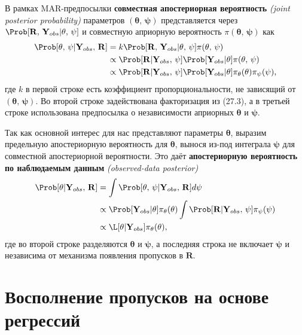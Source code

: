 В рамках MAR-предпосылки {\bf совместная апостериорная вероятность} \emph{(joint posterior probability)} параметров $(\mathbf{\theta}, \, \mathbf{\psi})$ представляется через $\Prob[\mathbf{R}, \, \mathbf{Y}_{obs}|\mathbf{\theta}, \, \mathbf{\psi}]$ и совместную априорную вероятность $\pi (\mathbf{\theta}, \, \mathbf{\psi})$ как
\begin{align}
\Prob[\mathbf{\theta}, \, \mathbf{\psi}|\mathbf{Y}_{obs}, \, \mathbf{R}] &= k \Prob[\mathbf{R}, \, \mathbf{Y}_{obs}|\mathbf{\theta}, \, \mathbf{\psi}] \pi (\mathbf{\theta}, \, \mathbf{\psi}) \\
&\propto \Prob[\mathbf{R}|\mathbf{Y}_{obs}, \, \mathbf{\psi}] \Prob[\mathbf{Y}_{obs}|\mathbf{\theta}]\pi (\mathbf{\theta}, \, \mathbf{\psi}) \notag \\
&\propto \Prob[\mathbf{R}|\mathbf{Y}_{obs}, \, \mathbf{\psi}] \Prob[\mathbf{Y}_{obs}|\mathbf{\theta}]\pi_{\theta} (\mathbf{\theta})\pi_{\psi} (\mathbf{\psi}), \notag
\end{align}
где $k$ в первой строке есть коэффициент пропорциональности, не зависящий от $(\mathbf{\theta}, \, \mathbf{\psi})$. Во второй строке задействована факторизация из (27.3), а в третьей строке использована предпосылка о независимости априорных $\mathbf{\theta}$ и $\mathbf{\psi}$.

Так как основной интерес для нас представляют параметры $\mathbf{\theta}$, выразим предельную апостериорную вероятность для $\mathbf{\theta}$, вынося из-под интеграла $\mathbf{\psi}$ для совместной апостериорной вероятности. Это даёт {\bf апостериорную вероятность по наблюдаемым данным} \emph{(observed-data posterior)}
\begin{align}
\Prob[\mathbf{\theta}|\mathbf{Y}_{obs}, \, \mathbf{R}] &= \int \Prob[\mathbf{\theta}, \, \mathbf{\psi}|\mathbf{Y}_{obs}, \, \mathbf{R}]d\mathbf{\psi} \\
&\propto \Prob[\mathbf{Y}_{obs}|\mathbf{\theta}]\pi_{\theta} (\mathbf{\theta}) \int \Prob[\mathbf{R}|\mathbf{Y}_{obs}, \, \mathbf{\psi}]\pi_{\psi} (\mathbf{\psi}) \notag \\
&\propto \L [\mathbf{\theta}|\mathbf{Y}_{obs}]\pi_{\theta} (\mathbf{\theta}), \notag 
\end{align}
где во второй строке разделяются $\mathbf{\theta}$ и $\mathbf{\psi}$, а последняя строка не включает $\mathbf{\psi}$ и независима от механизма появления пропусков в $\mathbf{R}$.

\section{Восполнение пропусков на основе регрессий} 

